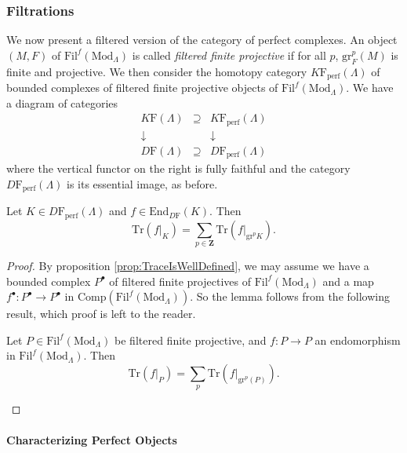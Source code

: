 \subsubsection*{Filtrations} 

We now present a filtered version of the category of perfect complexes. An object $(M,F)$ of $\text{Fil}^f(\text{Mod}_\Lambda)$ is called \emph{filtered finite projective} if for all $p$, $\text{gr}^p_F (M)$ is finite and projective. We then consider the homotopy category $K\mathrm{F}_{\text{perf}}(\Lambda)$ of bounded complexes of filtered finite projective objects of $\text{Fil}^f(\text{Mod}_\Lambda)$. We have a diagram of categories
$$
\begin{array}{ccccc}
K\mathrm{F}(\Lambda) & \supseteq & K\mathrm{F}_{\text{perf}}(\Lambda)\\
\downarrow & & \downarrow\\
D\mathrm{F}(\Lambda)  & \supseteq & D\mathrm{F}_{\text{perf}}(\Lambda)
\end{array}
$$
where the vertical functor on the right is fully faithful and the category $D\mathrm{F}_{\text{perf}}(\Lambda)$ is its essential image, as before.

\begin{lemma}[Additivity] 
Let $K\in D\mathrm{F}_{\text{perf}}(\Lambda)$ and $f\in \text{End}_{D\mathrm{F}}(K)$. Then 
$$
\text{Tr}(f|_K) = \sum_{p\in \mathbf{Z}} \text{Tr}(f|_{\text{gr}^p K}).
$$
\end{lemma}

\begin{proof} 
By proposition \ref{prop:TraceIsWellDefined}, we may assume we have a bounded complex $P^\bullet$ of filtered finite projectives of $\text{Fil}^f(\text{Mod}_\Lambda)$ and a map $f^\bullet: P^\bullet\to P^\bullet$ in $\text{Comp}(\text{Fil}^f(\text{Mod}_\Lambda))$. So the lemma follows from the following result, which proof is left to the reader.

\begin{lemma}
Let $P \in \text{Fil}^f(\text{Mod}_\Lambda)$ be filtered finite projective, and $f: P \to P$ an endomorphism in $\text{Fil}^f(\text{Mod}_\Lambda)$. Then
$$
\text{Tr}(f|_P) = \sum_p \text{Tr}(f|_{\text{gr}^p(P)}).
$$
\end{lemma}
\end{proof}

\paragraph{Characterizing Perfect Objects} 

